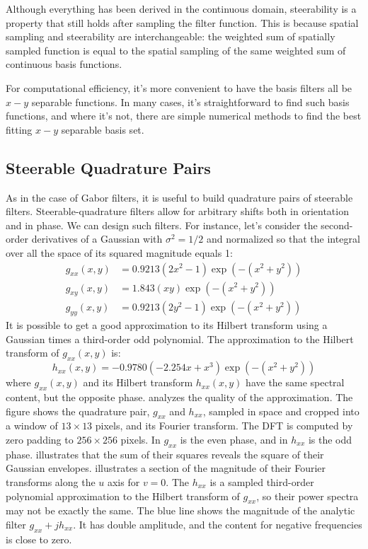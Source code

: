 Although everything has been derived in the continuous domain, steerability is a property that still holds after sampling the filter function. This is because spatial sampling and steerability are interchangeable: the weighted sum of spatially sampled function is equal to the spatial sampling of the same weighted sum of continuous basis functions.

For computational efficiency, it's more convenient to have the basis filters all be $x-y$ separable functions.  In many cases,
it's straightforward to find such basis functions, and where it's not, there are simple numerical methods to find the best fitting $x-y$
separable basis set.  %


\subsection{Steerable Quadrature Pairs}

As in the case of Gabor filters, it is useful to build quadrature pairs of steerable filters. Steerable-quadrature filters allow for arbitrary shifts both in orientation and in phase. We can design such filters. For instance, let's consider the second-order derivatives of a Gaussian with $\sigma^2=1/2$ and normalized so that the integral over all the space of its squared magnitude equals 1:
\begin{equation}
	\begin{split}
		g_{xx}(x,y) & = 0.9213(2x^2-1) \exp \left(-(x^2+y^2) \right) \\
		g_{xy}(x,y) & = 1.843 (x y) \exp \left(-(x^2+y^2) \right)    \\
		g_{yy}(x,y) & = 0.9213(2y^2-1) \exp \left(-(x^2+y^2) \right)
	\end{split}
\end{equation}
It is possible to get a good approximation to its Hilbert transform using a Gaussian times a third-order odd polynomial. The approximation to the Hilbert transform of $g_{xx}(x,y)$ is:
\begin{equation}
	h_{xx}(x,y) = -0.9780 (-2.254 x+x^3) \exp \left(-(x^2+y^2) \right)
\end{equation}
where $g_{xx}(x,y)$ and its Hilbert transform $h_{xx}(x,y)$ have the same spectral content, but the opposite phase. \Fig{\ref{fig:steerg2h2}} analyzes the quality of the approximation. The figure shows the quadrature pair, $g_{xx}$ and $h_{xx}$, sampled in space and cropped into a window of $13\times13$ pixels, and its Fourier transform.  The DFT is computed by zero padding to $256\times256$ pixels.  In  $g_{xx}$ is the even
phase, and in  $h_{xx}$ is the odd phase.   illustrates that the sum of their squares reveals
the square of their Gaussian envelopes.   illustrates a section of the magnitude of their
Fourier transforms along the $u$ axis for $v=0$. The $h_{xx}$ is a sampled third-order
polynomial approximation to the Hilbert transform of $g_{xx}$, so their
power spectra may not be exactly the same. The blue line shows the magnitude of the analytic filter $g_{xx}+jh_{xx}$. It has double amplitude, and the content for negative frequencies is close to zero.



